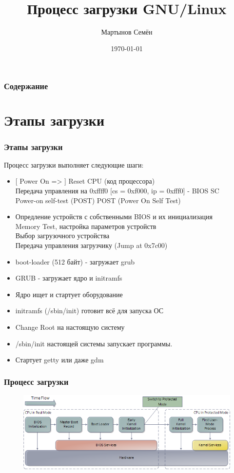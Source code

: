 \documentclass{beamer}
\title[Системное программирование]{Процесс загрузки GNU/Linux}
\author{Мартынов Семён}
\institute[СПб ПУ]
{
Санкт-Петербургский политехнический университет Петра Великого\\
\medskip
\textit{semen.martynov@gmail.com}
}
\date{\today}
\begin{document}
\begin{frame}
\titlepage
\end{frame}

\begin{frame}
\frametitle{Содержание}
\tableofcontents
\end{frame}

\section{Этапы загрузки}

\begin{frame}
\frametitle{Этапы загрузки}

Процесс загрузки выполняет следующие шаги:
\begin{itemize}
\item{[ Power On => ] Reset CPU (код процессора) \\
Передача управления на 0xffff0 [cs = 0xf000, ip = 0xfff0] - BIOS SC\\
Power-on self-test (POST) POST (Power On Self Test)}
\pause
\item{Опредление устройств с собственными BIOS и их инициализация\\
Memory Test, настройка параметров устройств\\
Выбор загрузочного устройства\\
Передача управления загрузчику (Jump at 0x7c00)}
\pause
\item boot-loader (512 байт) - загружает grub
\pause
\item GRUB - загружает ядро и initramfs
\pause
\item Ядро ищет и стартует оборудование
\pause
\item initramfs (/sbin/init) готовит всё для запуска ОС
\pause
\item Change Root на настоящую систему
\pause
\item /sbin/init настоящей системы запускает программы.
\pause
\item Стартует getty или даже gdm
\end{itemize}

\end{frame}


\begin{frame}
\frametitle{Процесс загрузки}

\begin{figure}
\includegraphics[scale=0.5]{res/bootProcess}
\end{figure}

\end{frame}
\end{document}
